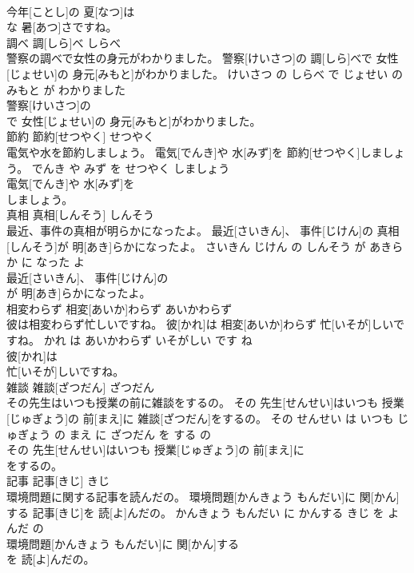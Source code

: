\documentclass[8pt]{extreport}
\begin{document}
\begin{CJK}{UTF8}{min}
\\	今年[ことし]の 夏[なつ]は
\\	な 暑[あつ]さですね。			
\\	調べ	調[しら]べ	しらべ	
\\	警察の調べで女性の身元がわかりました。	警察[けいさつ]の 調[しら]べで 女性[じょせい]の 身元[みもと]がわかりました。	けいさつ の しらべ で じょせい の みもと が わかりました	
\\	警察[けいさつ]の
\\	で 女性[じょせい]の 身元[みもと]がわかりました。			
\\	節約	節約[せつやく]	せつやく	
\\	電気や水を節約しましょう。	電気[でんき]や 水[みず]を 節約[せつやく]しましょう。	でんき や みず を せつやく しましょう	
\\	電気[でんき]や 水[みず]を
\\	しましょう。			
\\	真相	真相[しんそう]	しんそう	
\\	最近、事件の真相が明らかになったよ。	最近[さいきん]、 事件[じけん]の 真相[しんそう]が 明[あき]らかになったよ。	さいきん じけん の しんそう が あきらか に なった よ	
\\	最近[さいきん]、 事件[じけん]の
\\	が 明[あき]らかになったよ。			
\\	相変わらず	相変[あいか]わらず	あいかわらず	
\\	彼は相変わらず忙しいですね。	彼[かれ]は 相変[あいか]わらず 忙[いそが]しいですね。	かれ は あいかわらず いそがしい です ね	
\\	彼[かれ]は
\\	忙[いそが]しいですね。			
\\	雑談	雑談[ざつだん]	ざつだん	
\\	その先生はいつも授業の前に雑談をするの。	その 先生[せんせい]はいつも 授業[じゅぎょう]の 前[まえ]に 雑談[ざつだん]をするの。	その せんせい は いつも じゅぎょう の まえ に ざつだん を する の	
\\	その 先生[せんせい]はいつも 授業[じゅぎょう]の 前[まえ]に
\\	をするの。			
\\	記事	記事[きじ]	きじ	
\\	環境問題に関する記事を読んだの。	環境問題[かんきょう もんだい]に 関[かん]する 記事[きじ]を 読[よ]んだの。	かんきょう もんだい に かんする きじ を よんだ の	
\\	環境問題[かんきょう もんだい]に 関[かん]する
\\	を 読[よ]んだの。			

\end{CJK}
\end{document}
